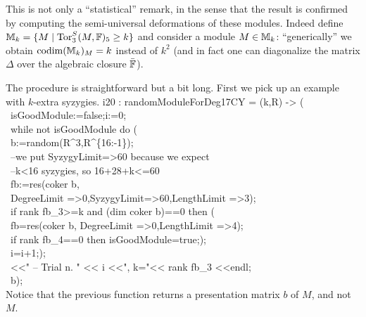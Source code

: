 This is not only a ``statistical'' remark, in the sense that 
the result is confirmed by computing the semi-universal deformations of these modules.
Indeed define ${\mathbb M}_k=\{ M \mid {\rm{Tor}}^S_3(M,{\mathbb F})_5 \ge k \}$ and 
consider a module $M\in {\mathbb M}_k$:
``generically'' we obtain $\operatorname{codim}({\mathbb M}_k)_M=k$ instead of $k^2$
(and in fact one can diagonalize the matrix $\Delta$ over 
the algebraic closure $\bar{{\mathbb F}}$).

The procedure is straightforward but a bit long. 
First we pick up an example with $k$-extra syzygies.
\beginOutput
i20 : randomModuleForDeg17CY = (k,R) -> (\\
\           isGoodModule:=false;i:=0;\\
\           while not isGoodModule do (\\
\                b:=random(R^3,R^\{16:-1\});\\
\                --we put SyzygyLimit=>60 because we expect \\
\                --k<16 syzygies, so 16+28+k<=60\\
\                fb:=res(coker b, \\
\                     DegreeLimit =>0,SyzygyLimit=>60,LengthLimit =>3);\\
\                if rank fb_3>=k and (dim coker b)==0 then (\\
\                     fb=res(coker b, DegreeLimit =>0,LengthLimit =>4);\\
\                     if rank fb_4==0 then isGoodModule=true;);\\
\                i=i+1;);\\
\           <<"     -- Trial n. " << i <<", k="<< rank fb_3 <<endl;\\
\           b);\\
\endOutput
Notice that the previous function returns a presentation matrix $b$ of $M$, 
and not $M$.

